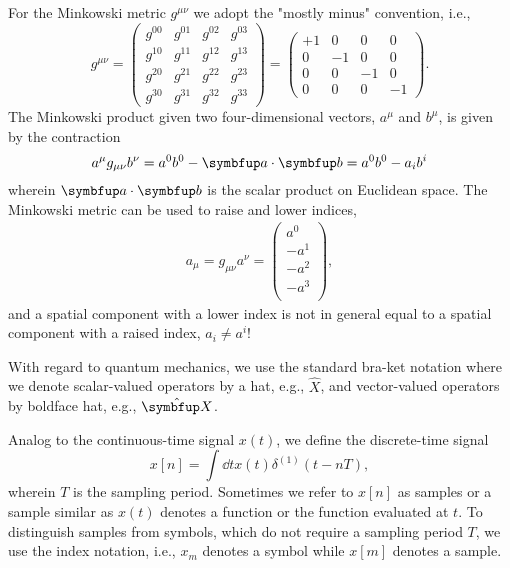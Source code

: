 For the Minkowski metric $g^{\mu\nu}$ we adopt the "mostly minus" convention, i.e.,
\begin{equation*}
	g^{\mu\nu}
	=
	\begin{pmatrix}
		g^{00} & g^{01} & g^{02} & g^{03} \\
		g^{10} & g^{11} & g^{12} & g^{13} \\
		g^{20} & g^{21} & g^{22} & g^{23} \\
		g^{30} & g^{31} & g^{32} & g^{33}
	\end{pmatrix}
	=
	\begin{pmatrix}
		+1 & 0 & 0 & 0 \\
		0 & -1 & 0 & 0 \\
		0 & 0 & -1 & 0 \\
		0 & 0 & 0 & -1
	\end{pmatrix}
	.
\end{equation*}
The Minkowski product given two four-dimensional vectors, $a^\mu$ and $b^\mu$, is given by the contraction
\begin{equation*}
	a^\mu g_{\mu\nu} b^\nu
	=
	a^0 b^0
	-
	\vb{a}\vdot\vb{b}
	=
	a^0 b^0
	-
	a_i b^i
\end{equation*}
wherein $\vb{a}\vdot\vb{b}$ is the scalar product on Euclidean space.
The Minkowski metric can be used to raise and lower indices,
\begin{align*}
	a_\mu
	=
	g_{\mu\nu}
	a^\nu
	=
	\begin{pmatrix}
		a^0 \\
		-a^1 \\
		-a^2 \\
		-a^3 \\
	\end{pmatrix}
	,
\end{align*}
and a spatial component with a lower index is not in general equal to a spatial component with a raised index, $a_i\neq a^i$!

With regard to quantum mechanics, we use the standard bra-ket notation where we denote scalar-valued operators by a hat, e.g., $\hat{X}$, and vector-valued operators by boldface hat, e.g., $\vu{X}$.

Analog to the continuous-time signal $x(t)$, we define the discrete-time signal
\begin{equation*}
	x[n]
	=
	\int\dd{t}
	x(t)
	\delta^{(1)}(t-nT)
	,
\end{equation*}
wherein $T$ is the sampling period.
Sometimes we refer to $x[n]$ as samples or a sample similar as $x(t)$ denotes a function or the function evaluated at $t$.
To distinguish samples from symbols, which do not require a sampling period $T$, we use the index notation, i.e., $x_m$ denotes a symbol while $x[m]$ denotes a sample.

